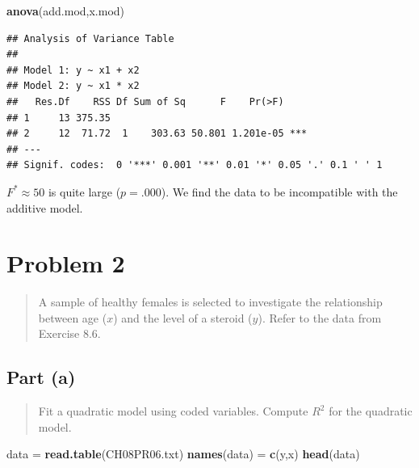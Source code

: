 \documentclass[
]{article}
\newenvironment{Shaded}{\begin{snugshade}}{\end{snugshade}}
\newcommand{\FunctionTok}[1]{\textcolor[rgb]{0.13,0.29,0.53}{\textbf{#1}}}
\newcommand{\NormalTok}[1]{#1}
\newcommand{\OtherTok}[1]{\textcolor[rgb]{0.56,0.35,0.01}{#1}}
\newcommand{\StringTok}[1]{\textcolor[rgb]{0.31,0.60,0.02}{#1}}
\begin{document}
\begin{Shaded}
\begin{Highlighting}[]
\FunctionTok{anova}\NormalTok{(add.mod,x.mod)}
\end{Highlighting}
\end{Shaded}

\begin{verbatim}
## Analysis of Variance Table
## 
## Model 1: y ~ x1 + x2
## Model 2: y ~ x1 * x2
##   Res.Df    RSS Df Sum of Sq      F    Pr(>F)    
## 1     13 375.35                                  
## 2     12  71.72  1    303.63 50.801 1.201e-05 ***
## ---
## Signif. codes:  0 '***' 0.001 '**' 0.01 '*' 0.05 '.' 0.1 ' ' 1
\end{verbatim}

\(F^* \approx 50\) is quite large (\(p = .000\)). We find the data to be
incompatible with the additive model.

\hypertarget{problem-2}{%
\section{Problem 2}\label{problem-2}}

\begin{quote}
A sample of healthy females is selected to investigate the relationship
between age (\(x\)) and the level of a steroid (\(y\)). Refer to the
data from Exercise 8.6.
\end{quote}

\hypertarget{part-a-1}{%
\subsection{Part (a)}\label{part-a-1}}

\begin{quote}
Fit a quadratic model using coded variables. Compute \(R^2\) for the
quadratic model.
\end{quote}

\begin{Shaded}
\begin{Highlighting}[]
\NormalTok{data }\OtherTok{=} \FunctionTok{read.table}\NormalTok{(}\StringTok{\textquotesingle{}CH08PR06.txt\textquotesingle{}}\NormalTok{)}
\FunctionTok{names}\NormalTok{(data) }\OtherTok{=} \FunctionTok{c}\NormalTok{(}\StringTok{\textquotesingle{}y\textquotesingle{}}\NormalTok{,}\StringTok{\textquotesingle{}x\textquotesingle{}}\NormalTok{)}
\FunctionTok{head}\NormalTok{(data)}
\end{Highlighting}
\end{Shaded}
\end{document}
